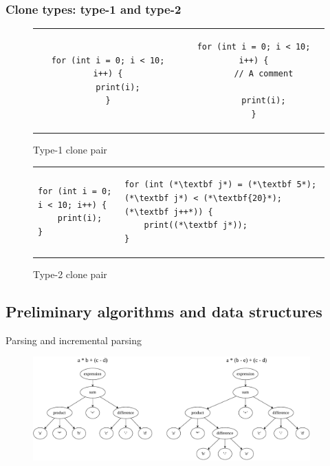 \documentclass[aspectratio=1610, xcolor=table]{beamer}
\begin{document}
\begin{frame}[fragile]
	\frametitle{Clone types: type-1 and type-2}
    \begin{figure}[t]
		\begin{center}
			\begin{tabular}{c | c}
				\begin{lstlisting}
for (int i = 0; i < 10;   i++) {
    print(i);
}
\end{lstlisting} &
				\begin{lstlisting}
for (int i = 0; i < 10; i++) {
    // A comment

    print(i);
}
            \end{lstlisting}
			\end{tabular}
		\end{center}
        \caption{Type-1 clone pair}
    \end{figure}
    \begin{figure}[t]
        	\begin{center}
        \begin{tabular}{p{6cm} | p{6cm}}
\begin{lstlisting}
for (int i = 0; i < 10; i++) {
    print(i);
}
\end{lstlisting} & \begin{lstlisting}
for (int (*\textbf j*) = (*\textbf 5*); (*\textbf j*) < (*\textbf{20}*); (*\textbf j++*)) {
    print((*\textbf j*));
}
\end{lstlisting}
		\end{tabular}
	\end{center}

        \caption{Type-2 clone pair}
    \end{figure}

\end{frame}

\subsection{Preliminary algorithms and data structures}
\begin{frame}{Parsing and incremental parsing}
    \begin{figure}
        \begin{center}
            \includegraphics[width=0.95\textwidth]{figures/incrementalparsing1.drawio.pdf}
        \end{center}
    \end{figure}
\end{frame}
\end{document}
